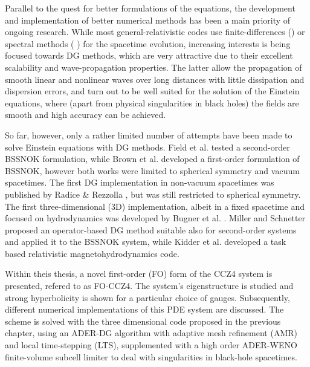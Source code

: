 \begin{fullwidth}
Parallel to the quest for better formulations of the equations, the
development and implementation of better numerical methods has been a
main priority of ongoing research. While most general-relativistic codes
use finite-differences (\eg \cite{Brown2007b,Zhang2006, mignone_2010_hoc,
  Radice2012a,Radice2013b}) or spectral methods (\eg
\cite{Szilagyi:2009qz}) for the spacetime evolution, increasing interests
is being focused towards DG methods, which are very attractive due to
their excellent scalability and wave-propagation properties.
The latter allow
the propagation of smooth linear and nonlinear waves over long distances
with little dissipation and dispersion errors, and turn out to be 
well suited for the solution of the Einstein equations, where (apart
from physical singularities in black holes) the fields are smooth and
high accuracy can be achieved.

So far, however, only a rather limited number of attempts have been made
to solve Einstein equations with DG methods. Field et al. \cite{field10}
tested a second-order BSSNOK formulation, while Brown et
al. \cite{Brown2012} developed a first-order formulation of BSSNOK,
however both works were limited to spherical symmetry and vacuum
spacetimes. The first DG implementation in non-vacuum spacetimes was
published by Radice \& Rezzolla \cite{Radice2011}, but was still
restricted to spherical symmetry. The first three-dimensional (3D)
implementation, albeit in a fixed spacetime and focused on hydrodynamics
was developed by Bugner et al. \cite{Bugner2015,Bugner2018}.
Miller and Schnetter \cite{Miller2016} proposed an operator-based DG 
method suitable also for second-order systems and applied it to the 
BSSNOK
system, while Kidder et al. \cite{Kidder2016} developed a task based
relativistic magnetohydrodynamics code.

Within theis thesis, a novel first-order (FO) form of the CCZ4 system is
presented, refered to as FO-CCZ4. The system's eigenstructure is studied
and strong hyperbolicity is shown for a particular choice of gauges.
Subsequently, different numerical implementations of this PDE system
are discussed. The scheme is solved with the three dimensional code
proposed in the previous chapter, using an ADER-DG algorithm with
adaptive mesh refinement (AMR) and local time-stepping (LTS),
supplemented with a high order ADER-WENO \cite{eno,Liu1994, Jiang1996}
finite-volume subcell limiter
\cite{Dumbser2009a,Dumbser2010,Dumbser2011} to deal with
singularities in black-hole spacetimes.


\end{fullwidth}
